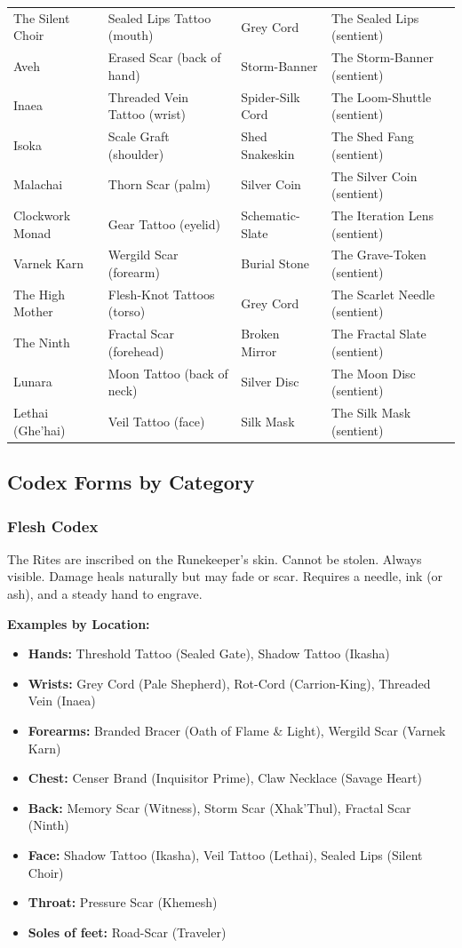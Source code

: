 \begin{table}[h]
\begin{tabular}{llll}
The Silent Choir & Sealed Lips Tattoo (mouth) & Grey Cord & The Sealed Lips (sentient) \\
Aveh & Erased Scar (back of hand) & Storm-Banner & The Storm-Banner (sentient) \\
\hline
Inaea & Threaded Vein Tattoo (wrist) & Spider-Silk Cord & The Loom-Shuttle (sentient) \\
Isoka & Scale Graft (shoulder) & Shed Snakeskin & The Shed Fang (sentient) \\
Malachai & Thorn Scar (palm) & Silver Coin & The Silver Coin (sentient) \\
\hline
Clockwork Monad & Gear Tattoo (eyelid) & Schematic-Slate & The Iteration Lens (sentient) \\
\hline
Varnek Karn & Wergild Scar (forearm) & Burial Stone & The Grave-Token (sentient) \\
The High Mother & Flesh-Knot Tattoos (torso) & Grey Cord & The Scarlet Needle (sentient) \\
\hline
The Ninth & Fractal Scar (forehead) & Broken Mirror & The Fractal Slate (sentient) \\
Lunara & Moon Tattoo (back of neck) & Silver Disc & The Moon Disc (sentient) \\
\hline
Lethai (Ghe'hai) & Veil Tattoo (face) & Silk Mask & The Silk Mask (sentient) \\
\hline
\end{tabular}
\end{table}

\subsection*{Codex Forms by Category}

\subsubsection*{Flesh Codex}
The Rites are inscribed on the Runekeeper's skin. Cannot be stolen. Always visible. Damage heals naturally but may fade or scar. Requires a needle, ink (or ash), and a steady hand to engrave.

\textbf{Examples by Location:}
\begin{itemize}
\item \textbf{Hands:} Threshold Tattoo (Sealed Gate), Shadow Tattoo (Ikasha)
\item \textbf{Wrists:} Grey Cord (Pale Shepherd), Rot-Cord (Carrion-King), Threaded Vein (Inaea)
\item \textbf{Forearms:} Branded Bracer (Oath of Flame \& Light), Wergild Scar (Varnek Karn)
\item \textbf{Chest:} Censer Brand (Inquisitor Prime), Claw Necklace (Savage Heart)
\item \textbf{Back:} Memory Scar (Witness), Storm Scar (Xhak'Thul), Fractal Scar (Ninth)
\item \textbf{Face:} Shadow Tattoo (Ikasha), Veil Tattoo (Lethai), Sealed Lips (Silent Choir)
\item \textbf{Throat:} Pressure Scar (Khemesh)
\item \textbf{Soles of feet:} Road-Scar (Traveler)
\end{itemize}


